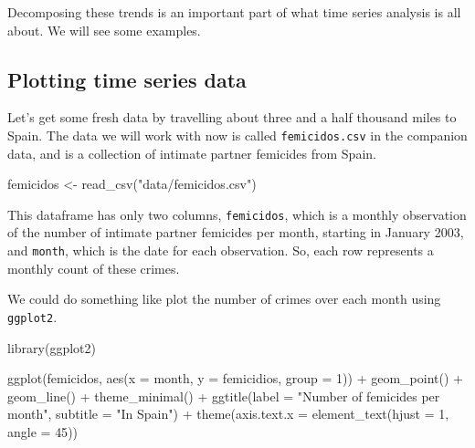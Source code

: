 \documentclass[
]{book}
\makeatletter
\newenvironment{Shaded}{\begin{snugshade}}{\end{snugshade}}
\newcommand{\AttributeTok}[1]{\textcolor[rgb]{0.61,0.61,0.61}{#1}}
\newcommand{\DecValTok}[1]{\textcolor[rgb]{0.06,0.06,0.06}{#1}}
\newcommand{\FunctionTok}[1]{\textcolor[rgb]{0,0,0}{#1}}
\newcommand{\NormalTok}[1]{#1}
\newcommand{\OtherTok}[1]{\textcolor[rgb]{0.37,0.37,0.37}{#1}}
\newcommand{\SpecialCharTok}[1]{\textcolor[rgb]{0,0,0}{#1}}
\newcommand{\StringTok}[1]{\textcolor[rgb]{0.5,0.5,0.5}{#1}}
\newenvironment{kframe}{%
\medskip{}
\setlength{\fboxsep}{.8em}
 \def\at@end@of@kframe{}%
 \ifinner\ifhmode%
  \def\at@end@of@kframe{\end{minipage}}%
  \begin{minipage}{\columnwidth}%
 \fi\fi%
 \def\FrameCommand##1{\hskip\@totalleftmargin \hskip-\fboxsep
 \colorbox{shadecolor}{##1}\hskip-\fboxsep
     \hskip-\linewidth \hskip-\@totalleftmargin \hskip\columnwidth}%
 \MakeFramed {\advance\hsize-\width
   \@totalleftmargin\z@ \linewidth\hsize
   \@setminipage}}%
 {\par\unskip\endMakeFramed%
 \at@end@of@kframe}
\renewenvironment{Shaded}{\begin{kframe}}{\end{kframe}}
\makeatother
\begin{document}
Decomposing these trends is an important part of what time series analysis is all about. We will see some examples.

\hypertarget{plotting-time-series-data}{%
\subsection{Plotting time series data}\label{plotting-time-series-data}}

Let's get some fresh data by travelling about three and a half thousand miles to Spain. The data we will work with now is called \texttt{femicidos.csv} in the companion data, and is a collection of intimate partner femicides from Spain.

\begin{Shaded}
\begin{Highlighting}[]
\NormalTok{femicidos }\OtherTok{\textless{}{-}} \FunctionTok{read\_csv}\NormalTok{(}\StringTok{"data/femicidos.csv"}\NormalTok{)}
\end{Highlighting}
\end{Shaded}

This dataframe has only two columns, \texttt{femicidos}, which is a monthly observation of the number of intimate partner femicides per month, starting in January 2003, and \texttt{month}, which is the date for each observation. So, each row represents a monthly count of these crimes.

We could do something like plot the number of crimes over each month using \texttt{ggplot2}.

\begin{Shaded}
\begin{Highlighting}[]
\FunctionTok{library}\NormalTok{(ggplot2)}

\FunctionTok{ggplot}\NormalTok{(femicidos, }\FunctionTok{aes}\NormalTok{(}\AttributeTok{x =}\NormalTok{ month, }\AttributeTok{y =}\NormalTok{ femicidios, }\AttributeTok{group =} \DecValTok{1}\NormalTok{)) }\SpecialCharTok{+} 
  \FunctionTok{geom\_point}\NormalTok{() }\SpecialCharTok{+} 
  \FunctionTok{geom\_line}\NormalTok{() }\SpecialCharTok{+} 
  \FunctionTok{theme\_minimal}\NormalTok{() }\SpecialCharTok{+} 
  \FunctionTok{ggtitle}\NormalTok{(}\AttributeTok{label =} \StringTok{"Number of femicides per month"}\NormalTok{, }\AttributeTok{subtitle =} \StringTok{"In Spain"}\NormalTok{) }\SpecialCharTok{+} 
  \FunctionTok{theme}\NormalTok{(}\AttributeTok{axis.text.x =} \FunctionTok{element\_text}\NormalTok{(}\AttributeTok{hjust =} \DecValTok{1}\NormalTok{, }\AttributeTok{angle =} \DecValTok{45}\NormalTok{))}
\end{Highlighting}
\end{Shaded}
\end{document}
